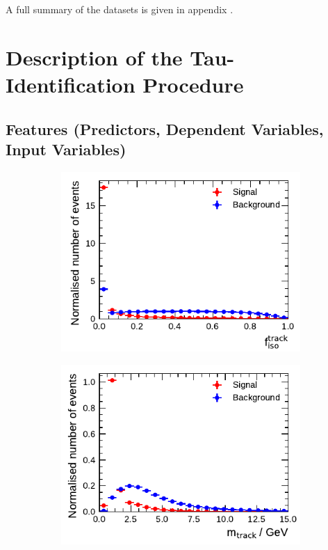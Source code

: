 A full summary of the datasets is given in appendix .

\section{Description of the Tau-Identification Procedure}
\label{sec:bdt_tauid}

\subsection{Features (Predictors, Dependent Variables, Input Variables)}
\label{sec:bdt_features}

\begin{figure}[ht]
  \begin{subfigure}[t]{0.48\textwidth}
    \centering
    \includegraphics{./figures/baseline_bdt_vars/1p/SumPtTrkFrac.pdf}
  \end{subfigure}\hfill
  \begin{subfigure}[t]{0.48\textwidth}
    \centering
    \includegraphics{./figures/baseline_bdt_vars/3p/massTrkSys.pdf}
  \end{subfigure}
  \caption{}
  \label{fig:bdt_discriminants}
\end{figure}

